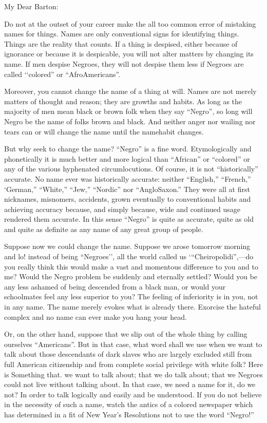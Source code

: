 \documentclass[letterpaper,10pt,english]{jupyterBook}
\begin{document}
\sphinxAtStartPar
My Dear Barton:

\sphinxAtStartPar
Do not at the outset of your career make the all too common error of mistaking names for things. Names are only conventional signs for identifying things. Things are the reality that counts. If a thing is despised, either because of ignorance or because it is despicable, you will not alter matters by changing its name. If men despise Negroes, they will not despise them less if Negroes are called ‘‘colored” or “Afro\sphinxhyphen{}Americans”.

\sphinxAtStartPar
Moreover, you cannot change the name of a thing at will. Names are not merely matters of thought and reason; they are growths and habits. As long as the majority of men mean black or brown folk when they say “Negro”, so long will Negro be the name of folks brown and black. And neither anger nor wailing nor tears can or will change the name until the name\sphinxhyphen{}habit changes.

\sphinxAtStartPar
But why seek to change the name? “Negro” is a fine word. Etymologically and phonetically it is much better and more logical than “African” or “colored” or any of the various hyphenated circumlocutions. Of course, it is not “historically” accurate. No name ever was historically accurate:  neither “English,” “French,” ‘German,” “White,” “Jew,” “Nordic” nor “Anglo\sphinxhyphen{}Saxon.” They were all at first nicknames, misnomers, accidents, grown eventually to conventional habits and achieving accuracy because, and simply because, wide and continued usage rendered them accurate. In this sense “Negro” is quite as accurate, quite as old and quite as definite as any name of any great group of people.

\sphinxAtStartPar
Suppose now we could change the name. Suppose we arose tomorrow morning and lo! instead of being “Negroes’’, all the world called us ‘“Cheiropolidi”,—do you really think this would make a vast and momentous difference to you and to me? Would the Negro problem be suddenly and eternally settled? Would you be any less ashamed of being descended from a black man, or would your schoolmates feel any less superior to you? The feeling of inferiority is in you, not in any name. The name merely evokes what is already there. Exorcise the hateful complex and no name can ever make you hang your head.

\sphinxAtStartPar
Or, on the other hand, suppose that we slip out of the whole thing by calling ourselves “Americans”. But in that case, what word shall we use when we want to talk about those descendants of dark slaves who are largely excluded still from full American citizenship and from complete social privilege with white folk? Here is Something that. we want to talk about; that we do talk about; that we Negroes could not live without talking about. In that case, we need a name for it, do we not? In order to talk logically and easily and be understood. If you do not believe in the necessity of such a name, watch the antics of a colored newspaper which has determined in a fit of New Year’s Resolutions not to use the word “Negro!”
\end{document}
